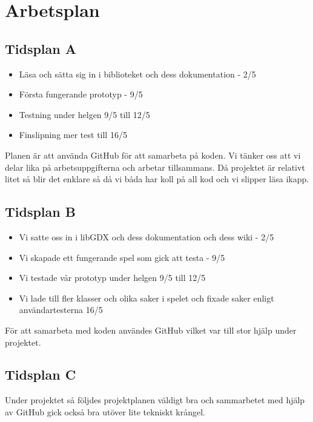 \documentclass[a4paper,11pt]{article}
\begin{document}
\section{Arbetsplan}
\subsection{Tidsplan A}
\begin{itemize}
\item Läsa och sätta sig in i biblioteket och dess dokumentation - 2/5
\item Första fungerande prototyp - 9/5
\item Testning under helgen 9/5 till 12/5
\item Finslipning mer test till 16/5
\end{itemize}

Planen är att använda GitHub för att samarbeta på koden. Vi tänker oss att vi delar lika på arbetsuppgifterna och arbetar tillsammans. Då projektet är relativt litet så blir det enklare så då vi båda har koll på all kod och vi slipper läsa ikapp.

\subsection{Tidsplan B}
\begin{itemize}
\item Vi satte oss in i libGDX och dess dokumentation och dess wiki - 2/5
\item Vi skapade ett fungerande spel som gick att testa - 9/5
\item Vi testade vår prototyp under helgen 9/5 till 12/5
\item Vi lade till fler klasser och olika saker i spelet och fixade saker enligt användartesterna 16/5
\end{itemize}

För att samarbeta med koden användes GitHub vilket var till stor hjälp under projektet.

\subsection{Tidsplan C}
Under projektet så följdes projektplanen väldigt bra och sammarbetet med hjälp av GitHub gick också bra utöver lite tekniskt krångel.
\end{document}
